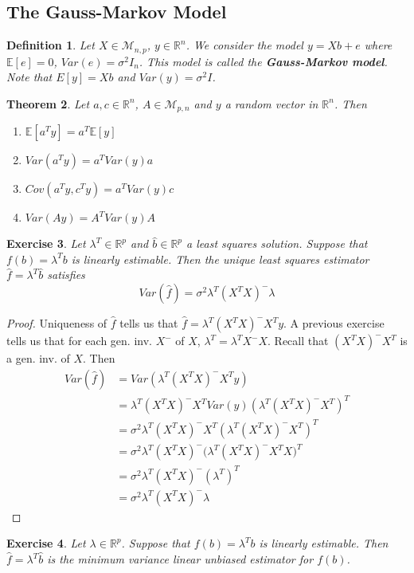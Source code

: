 \documentclass[12pt]{amsart}
\newtheorem{thm}{Theorem}[section]
\newtheorem{defn}[thm]{Definition}
\newtheorem{ex}[thm]{Exercise}
\newcommand{\lam}{\lambda}
\newcommand{\sig}{\sigma}
\newcommand{\E}{\mathbb{E}}
\newcommand{\R}{\mathbb{R}}
\newcommand{\MM}{\mathcal{M}}
\begin{document}
\subsection{The Gauss-Markov Model}
\begin{defn}
Let $X \in \MM_{n,p}$, $y \in \R^n$. We consider the model $y = Xb + e$ where $\E[e] = 0$, $Var(e) = \sig^2I_n$. This model is called the \textbf{Gauss-Markov model}. Note that $E[y] = Xb$ and $Var(y) = \sig^2 I$.
\end{defn}

\begin{thm}
Let $a, c \in \R^n$, $A \in \MM_{p,n}$ and $y$ a random vector in $\R^n$. 
Then 
\begin{enumerate}
\item $\E[a^Ty] = a^T\E[y]$ 
\item $Var(a^Ty) = a^TVar(y)a$
\item $Cov(a^Ty, c^Ty) = a^TVar(y)c$
\item $Var(Ay) = A^TVar(y)A $
\end{enumerate}
\end{thm}

\begin{ex}
Let $\lam^T \in \R^p$ and $\hat{b} \in \R^p$ a least squares solution. Suppose that $f(b) = \lam^Tb$ is linearly estimable. Then the unique least squares estimator $\hat{f} = \lam^T\hat{b}$ satisfies $$Var(\hat{f}) = \sig^2 \lam^T(X^TX)^- \lam$$  
\end{ex}

\begin{proof}
Uniqueness of $\hat{f}$ tells us that $\hat{f} = \lam^T(X^TX)^-X^Ty$. A previous exercise tells us that for each gen. inv. $X^-$ of $X$, $\lam^T = \lam^TX^-X$. Recall that $(X^TX)^-X^T$ is a gen. inv. of $X$. Then 
\begin{align*}
Var(\hat{f}) 
&= Var(\lam^T(X^TX)^-X^Ty) \\
&= \lam^T(X^TX)^-X^T Var(y)(\lam^T(X^TX)^-X^T)^T \\
&= \sig^2\lam^T(X^TX)^-X^T(\lam^T(X^TX)^-X^T)^T \\
&= \sig^2\lam^T(X^TX)^-\bigg(\lam^T(X^TX)^-X^TX\bigg)^T\\
&= \sig^2 \lam^T(X^TX)^- (\lam^T)^T\\
&= \sig^2 \lam^T(X^TX)^-\lam
\end{align*}
\end{proof}

\begin{ex}
Let $\lam \in \R^p$. Suppose that $f(b) = \lam^Tb$ is linearly estimable. Then $\hat{f} = \lam^T\hat{b}$ is the minimum variance linear unbiased estimator for $f(b)$. 
\end{ex}
\end{document}
